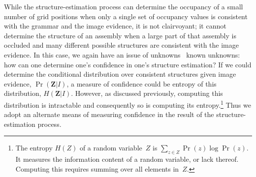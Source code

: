 While the structure-estimation process can determine the occupancy of a small
number of grid positions when only a single set of occupancy values is
consistent with the grammar and the image evidence, it is not clairvoyant; it
cannot determine the structure of an assembly when a large part of that
assembly is occluded and many different possible structures are consistent with
the image evidence.
%
In this case, we again have an issue of unknowns \vs\ known unknowns: how can
one determine one's confidence in one's structure estimation?
%
If we could determine the conditional distribution over consistent structures
given image evidence, $\Pr(\mathbf{Z}|I)$, a measure of confidence could be
entropy of this distribution, $H(\mathbf{Z}|I)$.
%
However, as discussed previously, computing this distribution is intractable
and consequently so is computing its entropy.\footnote{The entropy $H(Z)$ of a
  random variable~$Z$ is $\sum_{z\in Z}\Pr(z)\log\Pr(z)$.
  It measures the information content of a random variable, or lack thereof.
  Computing this requires summing over all elements in~$Z$.}
%
Thus we adopt an alternate means of measuring confidence in the result of the
structure-estimation process.

